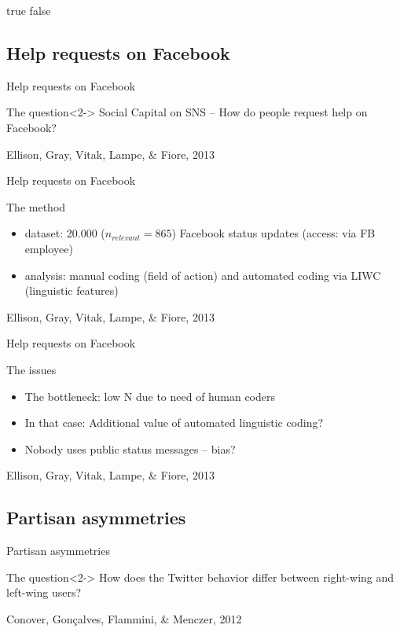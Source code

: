 \documentclass{beamer}
\begin{document}
\if true false
\subsection{Help requests on Facebook}
\begin{frame}{Help requests on Facebook}
\begin{block}{The question}<2->
Social Capital on SNS -- How do people request help on Facebook?
\end{block}
\footnotesize{Ellison, Gray, Vitak, Lampe, \& Fiore, 2013}
\end{frame}

\begin{frame}{Help requests on Facebook}
\begin{block}{The method}
\begin{itemize}
\item dataset: 20.000 ($n_{relevant} = 865$) Facebook status updates (access: via FB employee)
\item analysis: manual coding (field of action) and automated coding via LIWC (linguistic features)
\end{itemize}
\end{block}
\footnotesize{Ellison, Gray, Vitak, Lampe, \& Fiore, 2013}
\end{frame}

\begin{frame}{Help requests on Facebook}
\begin{block}{The issues}
\begin{itemize}
\item<2-> The bottleneck: low N due to need of human coders 
\item<3-> In that case: Additional value of automated linguistic coding?
\item<4-> Nobody uses public status messages -- bias?
\end{itemize}
\end{block}
\footnotesize{Ellison, Gray, Vitak, Lampe, \& Fiore, 2013}
\end{frame}
\fi



\subsection{Partisan asymmetries}
\begin{frame}{Partisan asymmetries}
\begin{block}{The question}<2->
How does the Twitter behavior differ between right-wing and left-wing users?
\end{block}
\footnotesize{Conover, Gonçalves, Flammini, \& Menczer, 2012}
\end{frame}
\end{document}
